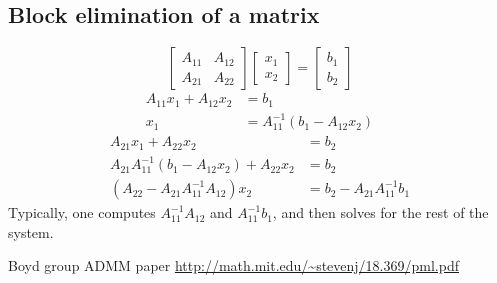 \documentclass{article}
\begin{document}
\begin{appendix}
\subsection{Block elimination of a matrix}\label{block elim}
\begin{equation}
\begin{bmatrix} A_{11} & A_{12} \\ A_{21} & A_{22} \end{bmatrix} 
\begin{bmatrix} x_1 \\ x_2 \end{bmatrix} = 
\begin{bmatrix} b_1 \\ b_2 \end{bmatrix}
\end{equation}
\begin{subequations}\begin{align}
A_{11} x_1 + A_{12} x_2 &= b_1 \\
x_1 &= A_{11}^{-1} (b_1 - A_{12} x_2)
\end{align}\end{subequations}
\begin{subequations}\begin{align}
A_{21} x_1 + A_{22} x_2 &= b_2 \\
A_{21} A_{11}^{-1} (b_1 - A_{12} x_2) + A_{22} x_2 &= b_2 \\
(A_{22} - A_{21} A_{11}^{-1} A_{12}) x_2 &= b_2 - A_{21} A_{11}^{-1} b_1
\end{align}\end{subequations}
Typically, one computes $A_{11}^{-1} A_{12}$ and $A_{11}^{-1} b_1$, 
    and then solves for the rest of the system.
\end{appendix}
\begin{thebibliography}{99}
 Boyd group ADMM paper
 \url{http://math.mit.edu/~stevenj/18.369/pml.pdf}
\end{thebibliography}
\end{document}
